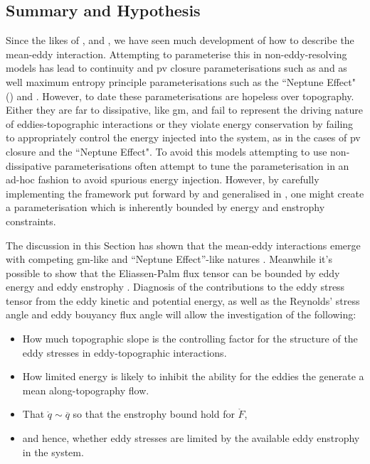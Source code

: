 \documentclass[10pt,a4paper]{article}
\newcommand*\thkmean[1]{\overline{#1}}
\newcommand*\spec[1]{\mathring{#1}}
\begin{document}
\subsection{Summary and Hypothesis}

Since the likes of \cite{young1982shear}, \cite{holloway1987systematic} and
\cite{gent1990}, we have seen much development of how to describe the mean-eddy interaction.
Attempting to parameterise this in non-eddy-resolving models has lead to 
continuity and \gls{pv} closure parameterisations such as \cite{gent1990}
and \cite{greatbatch1998exploring} as well maximum entropy principle parameterisations 
such as the ``Neptune Effect" (\cite{holloway1992representing}) and \cite{polyakov2001eddy}.
However, to date these parameterisations are hopeless over topography. Either
they are far to dissipative, like \gls{gm}, and fail to represent the driving nature
of eddies-topographic interactions or they violate energy conservation
by failing to appropriately control the energy injected into the system, as in the cases
of \gls{pv} closure and the ``Neptune Effect". To avoid this models attempting to
use non-dissipative parameterisations often attempt to tune the parameterisation in
an ad-hoc fashion to avoid spurious energy injection. However, by carefully implementing
the framework put forward by \cite{marshall2012framework} and generalised in
\cite{maddison2013eliassen}, one might create a parameterisation which is
inherently bounded by energy and enstrophy constraints.

The discussion in this Section has shown that the mean-eddy interactions 
emerge with competing \gls{gm}-like and ``Neptune Effect''-like natures
\cite{adcock2000interactions}. Meanwhile  it's possible to show that
the Eliassen-Palm flux tensor can be bounded by eddy energy and eddy enstrophy
\cite{marshall2012framework}.
Diagnosis of the contributions to the eddy stress tensor from
the eddy kinetic and potential energy, as well as the Reynolds' stress angle and eddy bouyancy flux angle will allow the investigation of the following:
\begin{itemize} 
		\item How much topographic slope is the controlling factor for the structure of the eddy stresses in eddy-topographic interactions.
		\item How limited energy is likely to inhibit the ability for the eddies the
			generate a mean along-topography flow.
	    \item That $\spec{q} \sim \thkmean{q}$ so that the enstrophy bound hold for $\spec{F}$,
		\item and hence, whether eddy stresses are limited by the available eddy enstrophy in the system.
\end{itemize} 
 
\end{document}
